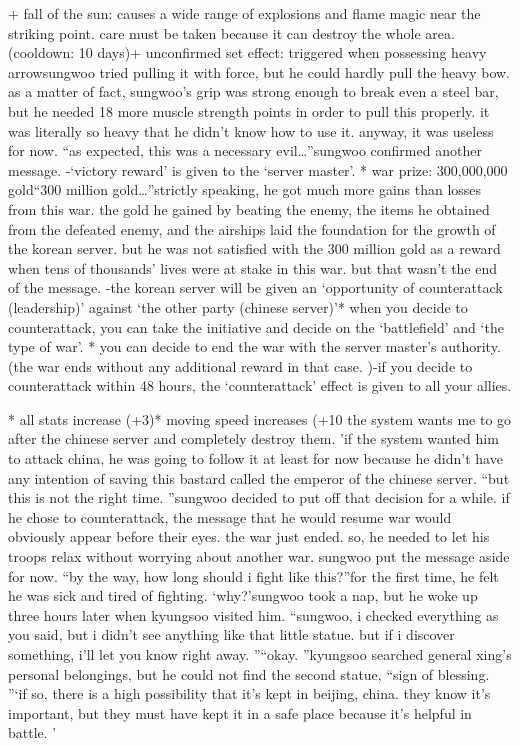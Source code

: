+ fall of the sun: causes a wide range of explosions and flame magic near the striking point.
 care must be taken because it can destroy the whole area.
 (cooldown: 10 days)+ unconfirmed set effect: triggered when possessing heavy arrowsungwoo tried pulling it with force, but he could hardly pull the heavy bow.
as a matter of fact, sungwoo’s grip was strong enough to break even a steel bar, but he needed 18 more muscle strength points in order to pull this properly.
 it was literally so heavy that he didn’t know how to use it.
 anyway, it was useless for now.
“as expected, this was a necessary evil…”sungwoo confirmed another message.
-‘victory reward’ is given to the ‘server master’.
* war prize: 300,000,000 gold“300 million gold…”strictly speaking, he got much more gains than losses from this war.
 the gold he gained by beating the enemy, the items he obtained from the defeated enemy, and the airships laid the foundation for the growth of the korean server.
but he was not satisfied with the 300 million gold as a reward when tens of thousands’ lives were at stake in this war.
but that wasn’t the end of the message.
-the korean server will be given an ‘opportunity of counterattack (leadership)’ against ‘the other party (chinese server)’* when you decide to counterattack, you can take the initiative and decide on the ‘battlefield’ and ‘the type of war’.
* you can decide to end the war with the server master’s authority.
 (the war ends without any additional reward in that case.
)-if you decide to counterattack within 48 hours, the ‘counterattack’ effect is given to all your allies.


* all stats increase (+3)* moving speed increases (+10%
 the system wants me to go after the chinese server and completely destroy them.
’if the system wanted him to attack china, he was going to follow it at least for now because he didn’t have any intention of saving this bastard called the emperor of the chinese server.
“but this is not the right time.
”sungwoo decided to put off that decision for a while.
 if he chose to counterattack, the message that he would resume war would obviously appear before their eyes.
the war just ended.
 so, he needed to let his troops relax without worrying about another war.
sungwoo put the message aside for now.
“by the way, how long should i fight like this?”for the first time, he felt he was sick and tired of fighting.
‘why?’sungwoo took a nap, but he woke up three hours later when kyungsoo visited him.
“sungwoo, i checked everything as you said, but i didn’t see anything like that little statue.
 but if i discover something, i’ll let you know right away.
”“okay.
”kyungsoo searched general xing’s personal belongings, but he could not find the second statue, “sign of blessing.
”‘if so, there is a high possibility that it’s kept in beijing, china.
 they know it’s important, but they must have kept it in a safe place because it’s helpful in battle.
’

 